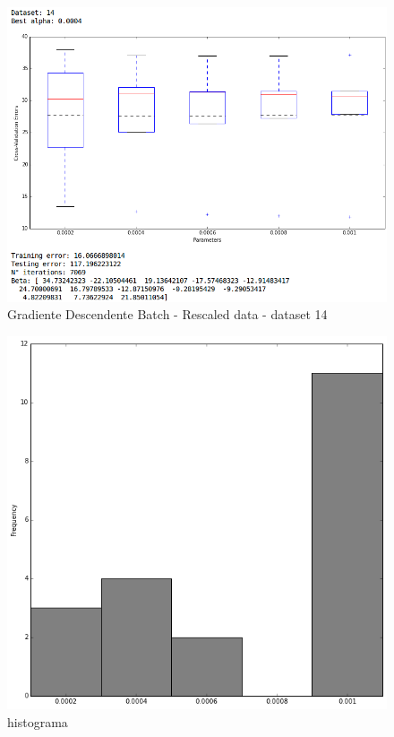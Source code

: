\documentclass[spanish, fleqn]{article}
\begin{document}
\begin{enumerate}
\begin{figure}[!htpb]
\centering
 \includegraphics[scale=0.45]{gd_batch_rescaled14.png}
 \caption{Gradiente Descendente Batch - Rescaled data - dataset 14}
\end{figure}

\begin{figure}[!htpb]
\centering
 \includegraphics[scale=0.4]{hist_gd_batch_rescaled.png}
 \caption{histograma}
\end{figure}


\end{enumerate}
\end{document}

